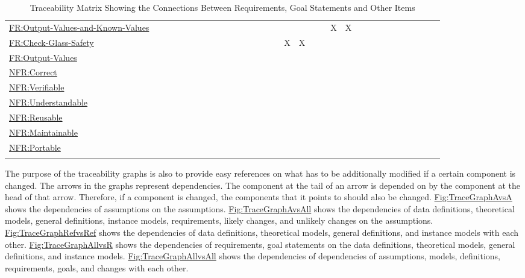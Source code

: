 \documentclass[12pt]{article}
\begin{document}
\begin{longtable}{l l l l l l l l l l l l l l l l l l l l l l l l l l l l l l l l}
\\
\hyperref[outputValsAndKnownValues]{FR:Output-Values-and-Known-Values} &  &  &  &  &  &  &  &  &  &  &  &  &  &  &  &  &  &  &  & X & X &  &  &  &  &  &  &  &  &  & 
\\
\hyperref[checkGlassSafety]{FR:Check-Glass-Safety} &  &  &  &  &  &  &  &  &  &  &  &  &  &  &  & X & X &  &  &  &  &  &  &  &  &  &  &  &  &  & 
\\
\hyperref[outputValues]{FR:Output-Values} &  &  &  &  &  &  &  &  &  &  &  &  &  &  &  &  &  &  &  &  &  &  &  &  &  &  &  &  &  &  & 
\\
\hyperref[correct]{NFR:Correct} &  &  &  &  &  &  &  &  &  &  &  &  &  &  &  &  &  &  &  &  &  &  &  &  &  &  &  &  &  &  & 
\\
\hyperref[verifiable]{NFR:Verifiable} &  &  &  &  &  &  &  &  &  &  &  &  &  &  &  &  &  &  &  &  &  &  &  &  &  &  &  &  &  &  & 
\\
\hyperref[understandable]{NFR:Understandable} &  &  &  &  &  &  &  &  &  &  &  &  &  &  &  &  &  &  &  &  &  &  &  &  &  &  &  &  &  &  & 
\\
\hyperref[reusable]{NFR:Reusable} &  &  &  &  &  &  &  &  &  &  &  &  &  &  &  &  &  &  &  &  &  &  &  &  &  &  &  &  &  &  & 
\\
\hyperref[maintainable]{NFR:Maintainable} &  &  &  &  &  &  &  &  &  &  &  &  &  &  &  &  &  &  &  &  &  &  &  &  &  &  &  &  &  &  & 
\\
\hyperref[portable]{NFR:Portable} &  &  &  &  &  &  &  &  &  &  &  &  &  &  &  &  &  &  &  &  &  &  &  &  &  &  &  &  &  &  & 
\\
\bottomrule
\caption{Traceability Matrix Showing the Connections Between Requirements, Goal Statements and Other Items}
\label{Table:TraceMatAllvsR}
\end{longtable}
The purpose of the traceability graphs is also to provide easy references on what has to be additionally modified if a certain component is changed. The arrows in the graphs represent dependencies. The component at the tail of an arrow is depended on by the component at the head of that arrow. Therefore, if a component is changed, the components that it points to should also be changed. \hyperref[Figure:TraceGraphAvsA]{Fig:TraceGraphAvsA} shows the dependencies of assumptions on the assumptions. \hyperref[Figure:TraceGraphAvsAll]{Fig:TraceGraphAvsAll} shows the dependencies of data definitions, theoretical models, general definitions, instance models, requirements, likely changes, and unlikely changes on the assumptions. \hyperref[Figure:TraceGraphRefvsRef]{Fig:TraceGraphRefvsRef} shows the dependencies of data definitions, theoretical models, general definitions, and instance models with each other. \hyperref[Figure:TraceGraphAllvsR]{Fig:TraceGraphAllvsR} shows the dependencies of requirements, goal statements on the data definitions, theoretical models, general definitions, and instance models. \hyperref[Figure:TraceGraphAllvsAll]{Fig:TraceGraphAllvsAll} shows the dependencies of dependencies of assumptions, models, definitions, requirements, goals, and changes with each other.
\end{document}

